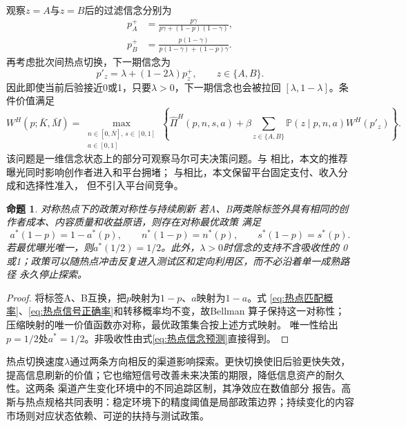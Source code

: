 \documentclass[UTF8, a4paper, 12pt, fontset=fandol]{ctexart}
\newtheorem{proposition}[theorem]{命题}
\theoremstyle{definition}
\theoremstyle{remark}
\newcommand{\Prb}{\mathbb{P}}
\begin{document}
观察$z=A$与$z=B$后的过滤信念分别为
\begin{align}
  p_A^+
  &=\frac{p\gamma}{p\gamma+(1-p)(1-\gamma)},\\
  p_B^+
  &=\frac{p(1-\gamma)}{p(1-\gamma)+(1-p)\gamma}.
  \label{eq:热点贝叶斯更新}
\end{align}
再考虑批次间热点切换，下一期信念为
\begin{equation}
  p'_{z}=\lambda+(1-2\lambda)p_z^+,
  \qquad z\in\{A,B\}.
  \label{eq:热点信念预测}
\end{equation}
因此即使当前后验接近0或1，只要$\lambda>0$，下一期信念也会被拉回
$[\lambda,1-\lambda]$。条件价值满足
\begin{equation}
  W^H(p;\bar K,\bar M)
  =\max_{\substack{n\in[0,\bar N],\,s\in[0,1]\\a\in[0,1]}}
  \left\{
  \widehat\Pi^H(p,n,s,a)
  +\beta\sum_{z\in\{A,B\}}\Prb(z\mid p,n,a)W^H(p'_z)
  \right\}.
  \label{eq:热点Bellman}
\end{equation}
该问题是一维信念状态上的部分可观察马尔可夫决策问题。与
\citet{che2018recommender}相比，本文的推荐曝光同时影响创作者进入和平台拥堵；
与\citet{cao2024exploration}相比，本文保留平台固定支付、收入分成和选择性准入，
但不引入平台间竞争。

\begin{proposition}{对称热点下的政策对称性与持续刷新}
  \label{prop:热点政策对称性}
  若A、B两类除标签外具有相同的创作者成本、内容质量和收益原语，则存在对称最优政策
  满足
  \begin{equation*}
    a^*(1-p)=1-a^*(p),
    \qquad n^*(1-p)=n^*(p),
    \qquad s^*(1-p)=s^*(p).
  \end{equation*}
  若最优曝光唯一，则$a^*(1/2)=1/2$。此外，$\lambda>0$时信念的支持不含吸收性的
  0或1；政策可以随热点冲击反复进入测试区和定向利用区，而不必沿着单一成熟路径
  永久停止探索。
\end{proposition}

\begin{proof}
  将标签A、B互换，把$p$映射为$1-p$、$a$映射为$1-a$。式
  \eqref{eq:热点匹配概率}、\eqref{eq:热点信号正确率}和转移概率均不变，故Bellman
  算子保持这一对称性；压缩映射的唯一价值函数亦对称，最优政策集合按上述方式映射。
  唯一性给出$p=1/2$处$a^*=1/2$。非吸收性由式\eqref{eq:热点信念预测}直接得到。
\end{proof}

热点切换速度$\lambda$通过两条方向相反的渠道影响探索。更快切换使旧后验更快失效，
提高信息刷新的价值；它也缩短信号改善未来决策的期限，降低信息资产的耐久性。这两条
渠道产生变化环境中的不同追踪区制\citep{keller1999changing}，其净效应在数值部分
报告。高斯与热点规格共同表明：稳定环境下的精度阈值是局部政策边界；持续变化的内容
市场则对应状态依赖、可逆的扶持与测试政策。
\end{document}
